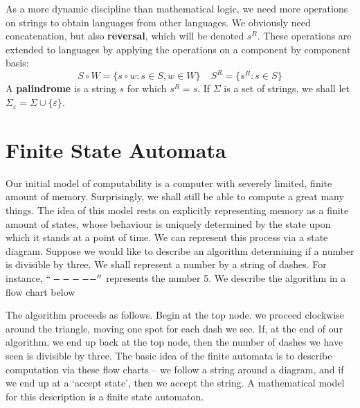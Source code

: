 As a more dynamic discipline than mathematical logic, we need more operations on strings to obtain languages from other languages. We obviously need concatenation, but also {\bf reversal}, which will be denoted $s^R$. These operations are extended to languages by applying the operations on a component by component basis:
%
\[ S \circ W = \{ s \circ w : s \in S, w \in W \}\ \ \ \ \ S^R = \{ s^R : s \in S \} \]
%
A {\bf palindrome} is a string $s$ for which $s^R = s$. If $\Sigma$ is a set of strings, we shall let $\Sigma_\varepsilon = \Sigma \cup \{ \varepsilon \}$.



\chapter{Finite State Automata}

Our initial model of computability is a computer with severely limited, finite amount of memory. Surprisingly, we shall still be able to compute a great many things. The idea of this model rests on explicitly representing memory as a finite amount of states, whose behaviour is uniquely determined by the state upon which it stands at a point of time. We can represent this process via a state diagram. Suppose we would like to describe an algorithm determining if a number is divisible by three. We shall represent a number by a string of dashes. For instance, $``-----''$ represents the number 5. We describe the algorithm in a flow chart below
%
\begin{center}
\end{center}
%
The algorithm proceeds as follows. Begin at the top node. we proceed clockwise around the triangle, moving one spot for each dash we see. If, at the end of our algorithm, we end up back at the top node, then the number of dashes we have seen is divisible by three. The basic idea of the finite automata is to describe computation via these flow charts -- we follow a string around a diagram, and if we end up at a `accept state', then we accept the string. A mathematical model for this description is a finite state automaton.

